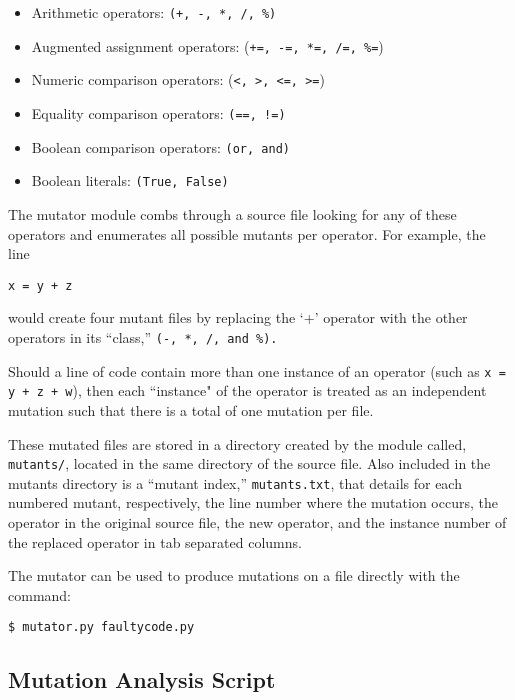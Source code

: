 \documentclass[english]{article}
\begin{document}
\begin{itemize} 
\item Arithmetic operators: \texttt{(+, -, *, /, \%)} 
\item Augmented assignment
operators: (\texttt{+=, -=, *=, /=, \%=}) 
\item Numeric comparison operators: (\texttt{<, >, <=,
>=})
\item Equality comparison operators: \texttt{(==, !=)} 
\item Boolean comparison operators:
\texttt{(or, and)} 
\item Boolean literals: \texttt{(True, False)} 
\end{itemize}

The mutator module combs through a source file looking for any of these operators and enumerates all
possible mutants per operator. For example, the line

\texttt{x = y + z}

would create four mutant files by replacing the `+' operator with the other operators in its
``class,'' \texttt{(-, *, /, and \%).}

Should a line of code contain more than one instance of an operator (such as \texttt{x = y + z + w}), then
each ``instance" of the operator is treated as an independent mutation such that there is a total of
one mutation per file.

These mutated files are stored in a directory created by the module called, \texttt{mutants/}, located in the
same directory of the source file. Also included in the mutants directory is a ``mutant index,''
\texttt{mutants.txt}, that
details for each numbered mutant, respectively, the line number where the mutation occurs, the operator in the
original source file, the new
operator, and the instance number of the replaced operator in tab separated columns.

The mutator can be used to produce mutations on a file directly with the command: \\
\begin{verbatim}
$ mutator.py faultycode.py
\end{verbatim}

\subsection{Mutation Analysis Script}
\end{document}
